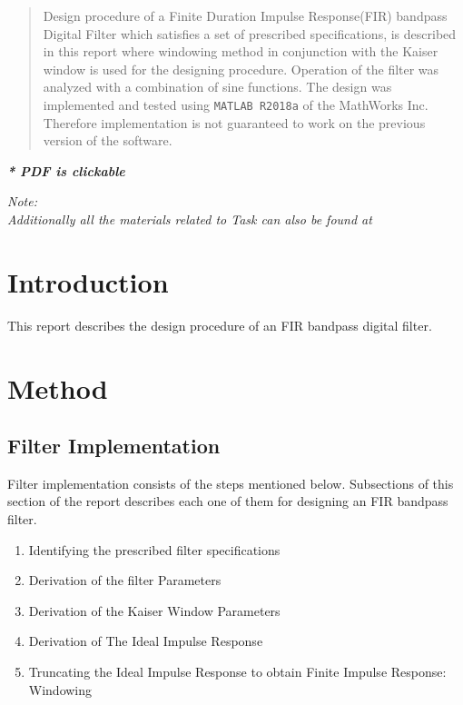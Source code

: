 \documentclass[a4paper,11pt]{article}%
\begin{document}


\begin{abstract}
	Design procedure of a Finite Duration Impulse Response(FIR) bandpass Digital Filter which satisfies a set of prescribed specifications, is described in this report where windowing method in conjunction with the Kaiser window is used for the designing procedure. Operation of the filter was analyzed with a combination of sine functions. The design was implemented and tested using {\tt MATLAB R2018a} of the MathWorks Inc. Therefore implementation is not guaranteed to work on the previous version of the software.
\end{abstract}

\pagebreak
\tableofcontents
\listoffigures
\listoftables
\begin{center}
	\textbf{\textit{* PDF is clickable}}
\end{center}



\textit{Note:}\\
\textit{Additionally all the materials related to Task can also be found at \url{}}
\pagebreak

\section{Introduction}

This report describes the design procedure of an FIR bandpass digital filter.

\section{Method}

\subsection{Filter Implementation}
Filter implementation consists of the steps mentioned below. Subsections of this section of the report describes each one of them for designing an FIR bandpass filter.

\begin{enumerate}[\hspace{1cm}1.]
	\item Identifying the prescribed filter specifications
	\item Derivation of the filter Parameters
	\item Derivation of the Kaiser Window Parameters
	\item Derivation of The Ideal Impulse Response
	\item Truncating the Ideal Impulse Response to obtain Finite Impulse Response: Windowing
\end{enumerate}
\pagebreak
\end{document}
